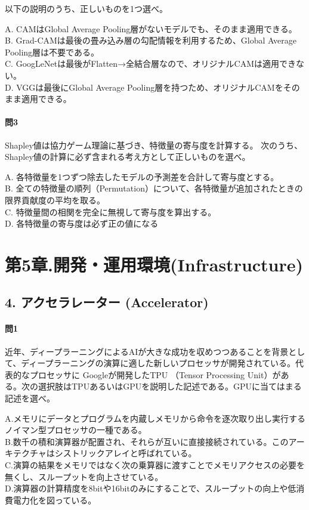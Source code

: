 \documentclass[
  letterpaper,
  DIV=11,
  numbers=noendperiod]{scrreprt}
\begin{document}
以下の説明のうち、正しいものを1つ選べ。

A. CAMはGlobal Average Pooling層がないモデルでも、そのまま適用できる。\\
B. Grad-CAMは最後の畳み込み層の勾配情報を利用するため、Global Average
Pooling層は不要である。\\
C.
GoogLeNetは最後がFlatten→全結合層なので、オリジナルCAMは適用できない。\\
D. VGGは最後にGlobal Average
Pooling層を持つため、オリジナルCAMをそのまま適用できる。

\subsection{問3}\label{ux554f3-1}

Shapley値は協力ゲーム理論に基づき、特徴量の寄与度を計算する。
次のうち、Shapley値の計算に必ず含まれる考え方として正しいものを選べ。

A. 各特徴量を1つずつ除去したモデルの予測差を合計して寄与度とする。\\
B.
全ての特徴量の順列（Permutation）について、各特徴量が追加されたときの限界貢献度の平均を取る。\\
C. 特徴量間の相関を完全に無視して寄与度を算出する。\\
D. 各特徴量の寄与度は必ず正の値になる

\part{第5章.開発・運用環境(Infrastructure)}

\chapter{4. アクセラレーター
(Accelerator)}\label{ux30a2ux30afux30bbux30e9ux30ecux30fcux30bfux30fc-accelerator}

\subsection{問1}\label{ux554f1-11}

近年、ディープラーニングによるAIが大きな成功を収めつつあることを背景として、ディープラーニングの演算に適した新しいプロセッサが開発されている。代表的なプロセッサに
Googleが開発したTPU （Tensor Processing
Unit）がある。次の選択肢はTPUあるいはGPUを説明した記述である。GPUに当てはまる記述を選べ。

A.メモリにデータとプログラムを内蔵しメモリから命令を逐次取り出し実行するノイマン型プロセッサの一種である。\\
B.数千の積和演算器が配置され、それらが互いに直接接続されている。このアーキテクチャはシストリックアレイと呼ばれている。\\
C.演算の結果をメモリではなく次の乗算器に渡すことでメモリアクセスの必要を無くし、スループットを向上させている。\\
D.演算器の計算精度を8bitや16bitのみにすることで、スループットの向上や低消費電力化を図っている。
\end{document}
